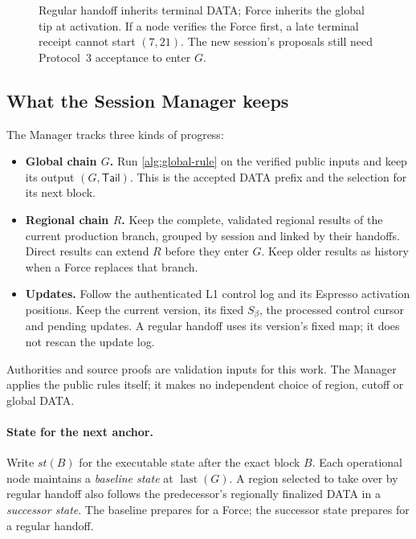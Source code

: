 \documentclass[11pt,a4paper]{article}
\newcommand{\defterm}[1]{\textcolor{rrBlue}{\textit{#1}}}
\begin{document}
\begin{figure}[H]\centering

\caption{Regular handoff inherits terminal DATA; Force inherits the global
tip at activation. If a node verifies the Force first, a late terminal
receipt cannot start $(7,21)$. The new session's proposals still need
Protocol~3 acceptance to enter $G$.}
\label{fig:concurrent-handoffs}
\end{figure}

\subsection{What the Session Manager keeps}
\label{sec:session-manager}
\label{sec:runtime-modules}
The Manager tracks three kinds of progress:
\begin{itemize}
\item \textbf{Global chain $G$.} Run \cref{alg:global-rule} on the
verified public inputs and keep its output $(G,\mathsf{Tail})$.
This is the accepted DATA prefix and the selection for its next block.
\item \textbf{Regional chain $R$.} Keep the complete, validated regional
results of the current production branch, grouped by session and linked
by their handoffs. Direct results can extend $R$ before they enter $G$.
Keep older results as history when a Force replaces that branch.
\item \textbf{Updates.} Follow the authenticated L1 control log and its
Espresso activation positions. Keep the current version, its fixed
$S_\beta$, the processed control cursor and pending updates. A regular
handoff uses its version's fixed map; it does not rescan the update log.
\end{itemize}
Authorities and source proofs are validation inputs for this work.
The Manager applies the public rules itself; it makes no independent
choice of region, cutoff or global DATA.

\paragraph{State for the next anchor.}
Write $\mathit{st}(B)$ for the executable state after the exact block
$B$. Each operational node maintains a \defterm{baseline state} at
$\operatorname{last}(G)$. A region selected to take over by regular
handoff also follows the predecessor's regionally finalized DATA in a
\defterm{successor state}. The baseline prepares for a Force; the
successor state prepares for a regular handoff.
\end{document}
